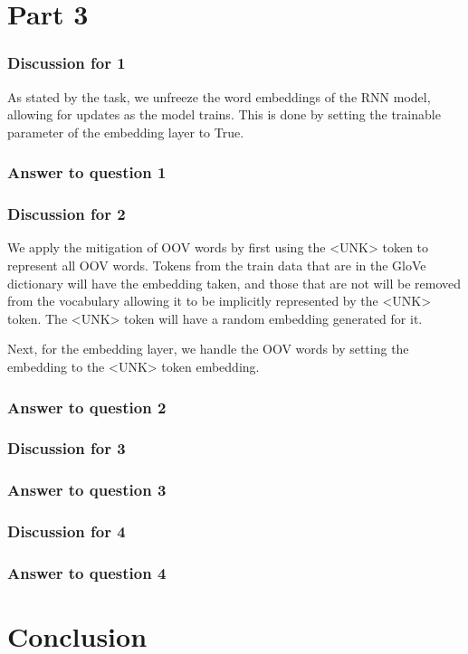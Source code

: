 \documentclass{article}
\begin{document}
\section*{Part 3}

\subsubsection*{Discussion for 1}

As stated by the task, we unfreeze the word embeddings of the RNN model, allowing
for updates as the model trains. This is done by setting the trainable parameter
of the embedding layer to True.

\subsubsection*{Answer to question 1}


\subsubsection*{Discussion for 2}

We apply the mitigation of OOV words by first using the <UNK> token to represent
all OOV words. Tokens from the train data that are in the GloVe dictionary will
have the embedding taken, and those that are not will be removed from the vocabulary
allowing it to be implicitly represented by the <UNK> token. The <UNK> token 
will have a random embedding generated for it.

Next, for the embedding layer, we handle the OOV words by setting the embedding
to the <UNK> token embedding.

\subsubsection*{Answer to question 2}

\subsubsection*{Discussion for 3}

\subsubsection*{Answer to question 3}

\subsubsection*{Discussion for 4}

\subsubsection*{Answer to question 4}

\section*{Conclusion}
\end{document}
